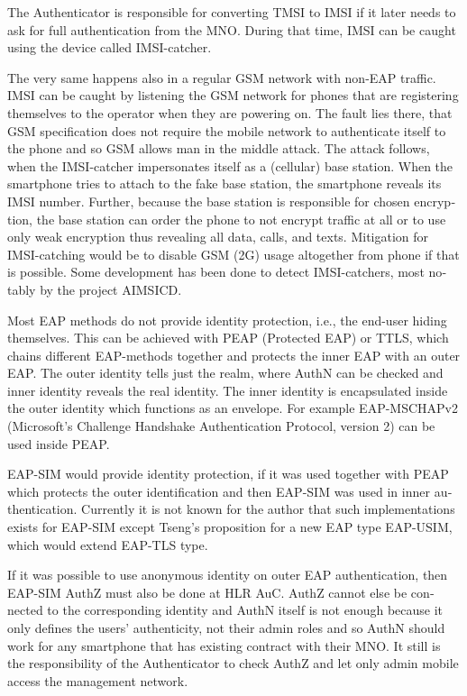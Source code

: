 \documentclass[12pt,a4paper,english]{tutthesis}
\begin{document}
\begin{otherlanguage}{english}
The Authenticator 
is responsible for converting  TMSI to IMSI if it later needs to 
ask for full authentication from the MNO. During that time,
IMSI can be caught using the device called IMSI-catcher.

The very same happens also in a regular GSM network with non-EAP traffic.
IMSI can be caught by listening the GSM network for phones that are
registering themselves to the operator when they are powering on.
The fault lies there, that GSM specification does not require the
mobile network to authenticate itself to the phone and so GSM allows
man in the middle attack. 
The attack follows, when the IMSI-catcher impersonates itself as a
(cellular) base station.  When the smartphone tries to attach to the fake base
station, the smartphone reveals its IMSI number. Further, because the
base station is responsible for chosen encryption, the base station
can order the phone to not encrypt traffic at all or to use only weak
encryption thus revealing all data, calls, and texts. Mitigation for
IMSI-catching would be to disable GSM (2G) usage altogether from phone
if that is possible\cite{imsi-heise}. Some development has been done to detect 
IMSI-catchers, most notably by the project AIMSICD\cite{aimcid}.


Most EAP methods do not provide identity protection, i.e., the
end-user hiding themselves.
This can be achieved with PEAP (Protected EAP) or TTLS, which
chains different EAP-methods together and protects the inner EAP with
an outer EAP. 
The outer identity tells just the realm, where AuthN can be checked
and inner identity reveals the real identity.  The inner identity is
encapsulated inside the outer identity which functions as an
envelope. 
For example EAP-MSCHAPv2 (Microsoft's Challenge
Handshake Authentication Protocol, version 2) can be used inside PEAP.


EAP-SIM would provide identity protection, if it was used together
with PEAP which protects the outer identification  and
then EAP-SIM was used in inner authentication.
Currently it is not known for the author that such implementations exists for
EAP-SIM  except Tseng's proposition\cite{tseng-usim} for a new EAP type
EAP-USIM, which would extend EAP-TLS type.

If it was possible to use anonymous identity on outer EAP
authentication, then EAP-SIM AuthZ must also be done at HLR AuC.
AuthZ cannot else be connected to the corresponding
identity and AuthN itself is not enough because it only defines the users'
authenticity, not their admin roles and so 
AuthN should work for any  smartphone that has existing contract with
their MNO. 
It still is the responsibility of the Authenticator to 
check AuthZ  and let only admin mobile access the management network.


\end{otherlanguage}
\end{document}
